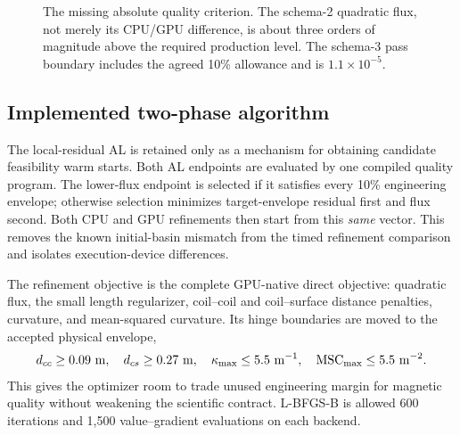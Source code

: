 \documentclass[11pt,a4paper]{article}
\begin{document}
\begin{figure}[htbp]
\centering
{}
\caption{The missing absolute quality criterion.  The schema-2 quadratic flux,
not merely its CPU/GPU difference, is about three orders of magnitude above the
required production level.  The schema-3 pass boundary includes the agreed
10\% allowance and is $1.1\times10^{-5}$.}
\label{fig:quadratic-flux-gap}
\end{figure}

\subsection{Implemented two-phase algorithm}

The local-residual AL is retained only as a mechanism for obtaining candidate
feasibility warm starts.  Both AL endpoints are evaluated by one compiled
quality program.  The lower-flux endpoint is selected if it satisfies every
10\% engineering envelope; otherwise selection minimizes target-envelope
residual first and flux second.  Both CPU and GPU refinements then start from
this \emph{same} vector.  This removes the known initial-basin mismatch from the
timed refinement comparison and isolates execution-device differences.

The refinement objective is the complete GPU-native direct objective:
quadratic flux, the small length regularizer, coil--coil and coil--surface
distance penalties, curvature, and mean-squared curvature.  Its hinge
boundaries are moved to the accepted physical envelope,
\[
 d_{cc}\geq0.09\ {\rm m},\quad d_{cs}\geq0.27\ {\rm m},\quad
 \kappa_{\max}\leq5.5\ {\rm m}^{-1},\quad {\rm MSC}_{\max}\leq5.5\ {\rm m}^{-2}.
\]
This gives the optimizer room to trade unused engineering margin for magnetic
quality without weakening the scientific contract.  L-BFGS-B is allowed 600
iterations and 1,500 value--gradient evaluations on each backend.
\end{document}
